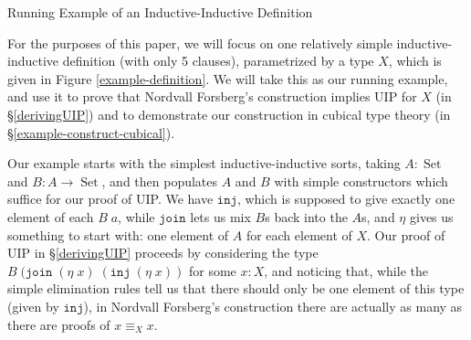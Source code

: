 \documentclass[runningheads]{llncs}
\newcommand{\erase}[1]{{}}
\DeclareMathOperator{\USet}{Set}
\newcommand{\IdA}[3]{{#1}\equiv_{#3}{#2}}
\newcommand{\join}{\texttt{join}}
\newcommand{\inj}{\texttt{inj}}
\def\Forsberg/{Nordvall Forsberg}
\begin{document}
\begin{section}{\label{II-examples}Running Example of an Inductive-Inductive Definition}

\erase{
Inductive-inductive definitions have many potential uses.
We have already seen an example with contexts and types in the introduction, which is the classic example of an inductive-inductive definition. \citet{KaposiKovacsHIITsyntax} have given a definition of what is an inductive-inductive definition; here we give some more examples.
}
\erase{
For an example with a more mathematical flavor, we can consider the dense completion of a relation (example from \citet{nordvallforsberg2013thesis}). Given a set $A$ and relation $\leq$ on $A$, the relation is called dense if for all $x$ and $y$ in $A$ such that $x \leq y$, there is a point $x \leq \text{mid}(x,y) \leq y$. The dense completion of a relation $(A,\leq)$ is the smallest relation $(A^*,\leq^*)$ which contains $(A,\leq)$ and is dense. We can write this as an inductive-inductive definition by taking
\begin{align*}
A^* &: \USet,\\
\leq^* &: A^* \to A^* \to A^*,\\
\eta_A &: A \to A^*,\\
\eta_\leq &: (x : A) \to (y : A) \to x \leq y \to \eta_A\;x \leq^* \eta_A\;y,\\
\text{mid} &: (x : A^*) \to (y : A^*) \to x \leq^* y \to A^*,\\
\text{mid}_l &: (x : A^*) \to (y : A^*) \to (p : x \leq^* y) \to x \leq^* \text{mid}\;x\;y\;p,\\
\text{mid}_r &: (x : A^*) \to (y : A^*) \to (p : x \leq^* y) \to \text{mid}\;x\;y\;p \leq^* y.
\end{align*}
Here the $\eta$ rules express that $(A, \leq)$ is a sub-relation of $(A^*, \leq^*)$, while $\text{mid}$ equips $(A^*, \leq^*)$ with a midpoint for every two related points.
}

For the purposes of this paper, we will focus on one relatively simple inductive-inductive definition (with only 5 clauses), parametrized by a type $X$, which is given in Figure \ref{example-definition}.
We will take this as our running example, and use it to prove that \Forsberg/'s construction implies UIP for $X$ (in \S\ref{derivingUIP}) and to demonstrate our construction in cubical type theory (in \S\ref{example-construct-cubical}).

Our example starts with the simplest inductive-inductive sorts, taking $A : \USet$ and $B : A \to \USet$, and then populates $A$ and $B$ with simple constructors which suffice for our proof of UIP. We have $\inj$, which is supposed to give exactly one element of each $B\;a$, while $\join$ lets us mix $B$s back into the $A$s, and $\eta$ gives us something to start with: one element of $A$ for each element of $X$.
Our proof of UIP in \S\ref{derivingUIP} proceeds by considering the type $B\;(\join\;(\eta\;x)\;(\inj\;(\eta\;x))$ for some $x : X$, and noticing that, while the simple elimination rules tell us that there should only be one element of this type (given by $\inj$), in \Forsberg/'s construction there are actually as many as there are proofs of $\IdA{x}{x}{X}$.


\end{section}
\end{document}
